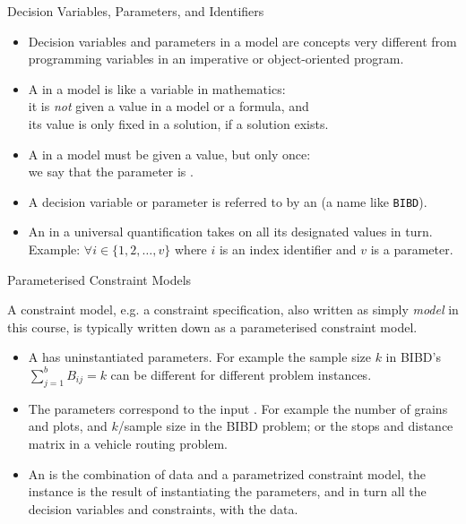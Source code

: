 \documentclass{cons-beamer}
\begin{document}
\begin{frame}{Decision Variables, Parameters, and Identifiers} 
  \begin{itemize}
    \item Decision variables and parameters in a model are concepts very different from programming variables in an imperative or object-oriented program. \vfill
    
    \item A  in a model is like a variable in mathematics: \\
          it is \emph{not} given a value in a model or a formula, and \\
          its value is only fixed in a solution, if a solution exists. \vfill
          
    \item A  in a model must be given a value, but only once: \\
          we say that the parameter is . \vfill
          
    \item A decision variable or parameter is referred to by an  (a name like \texttt{BIBD}). \vfill
    
    \item An  in a universal quantification takes on all its designated values in turn. \\
          Example: $\forall i \in \{1, 2, \dots, v\}$ where $i$ is an index identifier and $v$ is a parameter.
  \end{itemize}
\end{frame}

\begin{frame}{Parameterised Constraint Models}

A constraint model, e.g. a constraint specification, also written as simply \textit{model} in this course, is typically written down as a parameterised constraint model.
\vfill

  \begin{itemize}
    \item A  has uninstantiated parameters. For example the sample size $k$ in BIBD's $\sum_{j=1}^b B_{ij} = k$ can be different for different problem instances. \vfill

    \item The parameters correspond to the input . For example the number of grains and plots, and $k$/sample size in the BIBD problem; or the stops and distance matrix in a vehicle routing problem.\vfill
  
    \item An  is the combination of data and a parametrized constraint model, the instance is the result of instantiating the parameters, and in turn all the decision variables and constraints, with the data. 
  \end{itemize}
\end{frame}
\end{document}
